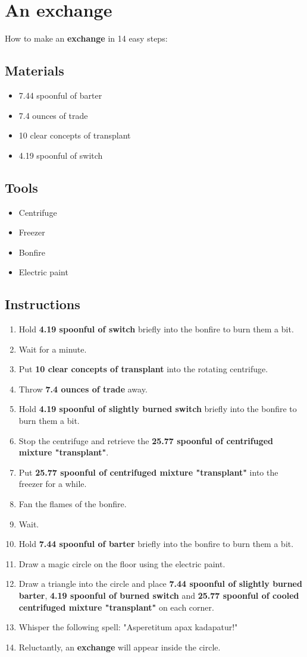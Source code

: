 \documentclass{article}
\begin{document}
\section{An exchange}How to make an \textbf{exchange} in 14 easy steps:

\subsection{Materials}\begin{itemize}
\item 
7.44 spoonful of barter
\item 
7.4 ounces of trade
\item 
10 clear concepts of transplant
\item 
4.19 spoonful of switch
\end{itemize}
\subsection{Tools}\begin{itemize}
\item 
Centrifuge
\item 
Freezer
\item 
Bonfire
\item 
Electric paint
\end{itemize}
\subsection{Instructions}\begin{enumerate}
\item 
Hold \textbf{4.19 spoonful of switch} briefly into the bonfire to burn them a bit.
\item 
Wait for a minute.
\item 
Put \textbf{10 clear concepts of transplant} into the rotating centrifuge.
\item 
Throw \textbf{7.4 ounces of trade} away.
\item 
Hold \textbf{4.19 spoonful of slightly burned switch} briefly into the bonfire to burn them a bit.
\item 
Stop the centrifuge and retrieve the \textbf{25.77 spoonful of centrifuged mixture "transplant"}.
\item 
Put \textbf{25.77 spoonful of centrifuged mixture "transplant"} into the freezer for a while.
\item 
Fan the flames of the bonfire.
\item 
Wait.
\item 
Hold \textbf{7.44 spoonful of barter} briefly into the bonfire to burn them a bit.
\item 
Draw a magic circle on the floor using the electric paint.
\item 
Draw a triangle into the circle and place \textbf{7.44 spoonful of slightly burned barter}, \textbf{4.19 spoonful of burned switch} and \textbf{25.77 spoonful of cooled centrifuged mixture "transplant"} on each corner.
\item 
Whisper the following spell: "Asperetitum apax kadapatur!"
\item 
Reluctantly, an \textbf{exchange} will appear inside the circle.
\end{enumerate}
\newpage
\end{document}
